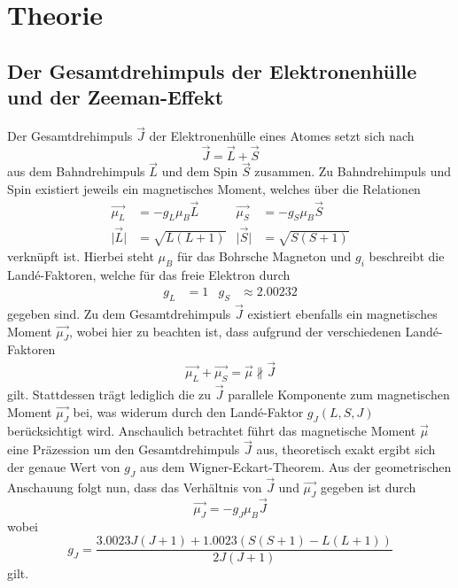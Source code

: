 \section{Theorie}
\label{sec:Theorie}

\subsection{Der Gesamtdrehimpuls der Elektronenhülle und der Zeeman-Effekt}
Der Gesamtdrehimpuls $\vec{J}$ der Elektronenhülle eines Atomes setzt sich nach
\begin{equation}
  \vec{J} = \vec{L} + \vec{S}
\end{equation}
aus dem Bahndrehimpuls $\vec{L}$ und dem Spin $\vec{S}$ zusammen.
Zu Bahndrehimpuls und Spin existiert jeweils ein magnetisches Moment, welches über die Relationen
\begin{align}
  \vec{\mu_L} &= - g_L \mu_B \vec{L} & \vec{\mu_S} &= - g_S \mu_B \vec{S} \\
  \lvert \vec{L} \rvert &= \sqrt{L(L+1)} & \lvert \vec{S} \rvert &= \sqrt{S(S+1)}
\end{align}
verknüpft ist.
Hierbei steht $\mu_B$ für das Bohrsche Magneton und $g_i$ beschreibt die Land\'{e}-Faktoren, welche für das freie Elektron durch
\begin{align}
  g_L &= 1 & g_S &\approx \num{2.00232}
\end{align}
gegeben sind.
Zu dem Gesamtdrehimpuls $\vec{J}$ existiert ebenfalls ein magnetisches Moment $\vec{\mu_J}$, wobei hier zu beachten ist, dass aufgrund der verschiedenen Land\'{e}-Faktoren
\begin{align*}
  \vec{\mu_L} + \vec{\mu_S} = \vec{\mu} \nparallel \vec{J}
\end{align*}
gilt.
Stattdessen trägt lediglich die zu $\vec{J}$ parallele Komponente zum magnetischen Moment $\vec{\mu_J}$ bei, was widerum durch den Land\'{e}-Faktor $g_J(L, S, J)$ berücksichtigt wird.
Anschaulich betrachtet führt das magnetische Moment $\vec{\mu}$ eine Präzession um den Gesamtdrehimpuls $\vec{J}$ aus, theoretisch exakt ergibt sich der genaue Wert von $g_J$ aus dem Wigner-Eckart-Theorem.
Aus der geometrischen Anschauung folgt nun, dass das Verhältnis von $\vec{J}$ und $\vec{\mu_J}$ gegeben ist durch
\begin{equation}
  \vec{\mu_J} = - g_J \mu_B \vec{J}
\end{equation}
wobei
\begin{equation}
  g_J = \frac{ \num{3.0023} J \left(J+1\right) + \num{1.0023} \left( S \left( S+1 \right) - L \left(L+1\right) \right) }{ 2 J \left(J+1\right) }
\end{equation}
gilt. \\


